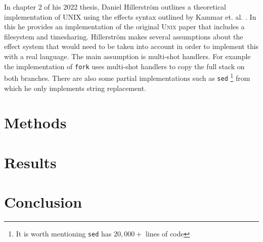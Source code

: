 \documentclass[logo,bsc,singlespacing,parskip]{infthesis}
\begin{document}
In chapter 2 of his 2022 thesis, Daniel Hillerstr\"{o}m
\cite{hillerstrom2022foundations} outlines a theoretical implementation of UNIX
using the effects syntax outlined by Kammar et. al. \cite{kammar2013handlers}.
In this he provides an implementation of the original \textsc{Unix} paper
\cite{ritchie1978unix} that includes a filesystem and timesharing.
Hillerstr\"{o}m makes several assumptions about the effect system that would
need to be taken into account in order to implement this with a real language.
The main assumption is multi-shot handlers. For example the implementation of
\texttt{fork} uses multi-shot handlers to copy the full stack on both branches.
There are also some partial implementations such as \texttt{sed} \footnote{It is
worth mentioning \texttt{sed} has $20,000+$ lines of code} from which he only
implements string replacement.

\chapter{Methods}

\chapter{Results}

\chapter{Conclusion}



\end{document}
